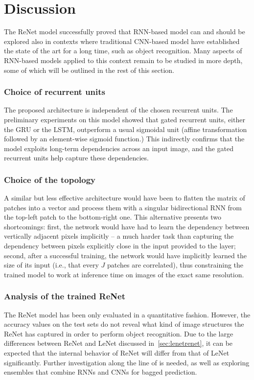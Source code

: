 \section{Discussion}

The ReNet model successfully proved that RNN-based model can and should be
explored also in contexts where traditional CNN-based model have established
the state of the art for a long time, such as object recognition. Many aspects
of RNN-based models applied to this context remain to be studied in more depth,
some of which will be outlined in the rest of this section.

\subsubsection{Choice of recurrent units}
The proposed architecture is independent of the chosen recurrent units. The
preliminary experiments on this model showed that gated recurrent units, either
the GRU or the LSTM, outperform a usual sigmoidal unit (affine transformation
followed by an element-wise sigmoid function.) This indirectly confirms that
the model exploits long-term dependencies across an input image, and the gated
recurrent units help capture these dependencies.

\subsubsection{Choice of the topology}
A similar but less effective architecture would have been to flatten the matrix
of patches into a vector and process them with a singular bidirectional RNN
from the top-left patch to the bottom-right one. This alternative presents two
shortcomings: first, the network would have had to learn the dependency between
vertically adjacent pixels implicitly -- a much harder task than capturing the
dependency between pixels explicitly close in the input provided to the layer;
second, after a successful training, the network would have implicitly learned
the size of its input (i.e., that every $J$ patches are correlated), thus
constraining the trained model to work at inference time on images of the exact
same resolution.

\subsubsection{Analysis of the trained ReNet}
The ReNet model has been only evaluated in a quantitative fashion. However, the
accuracy values on the test sets do not reveal what kind of image structures
the ReNet has captured in order to perform object recognition. Due to the large
differences between ReNet and LeNet discussed in~\autoref{sec:lenetrenet}, it
can be expected that the internal behavior of ReNet will differ from that of
LeNet significantly. Further investigation along the line of
\citep{ZeilerFergus14} is needed, as well as exploring ensembles that combine
RNNs and CNNs for bagged prediction.

